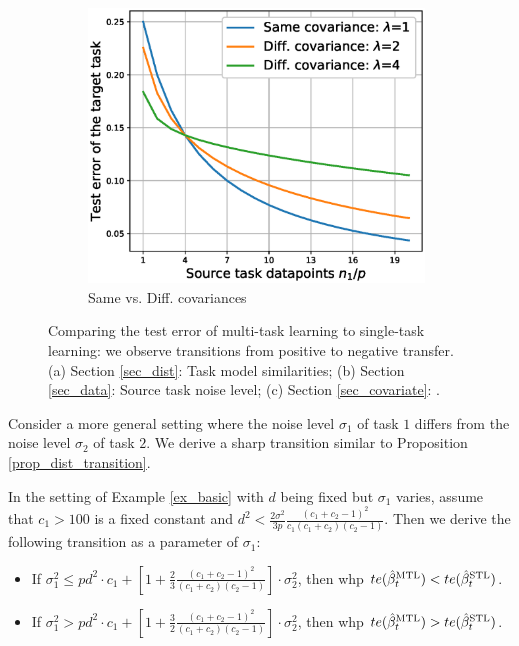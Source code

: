 \begin{figure}
\begin{subfigure}[b]{0.31\textwidth}
		\centering
		\includegraphics[width=0.98\textwidth]{figures/complementary.eps}
		\caption{Same vs. Diff. covariances}
	\end{subfigure}
	\caption{Comparing the test error of multi-task learning to single-task learning: we observe transitions from positive to negative transfer. (a) Section \ref{sec_dist}: Task model similarities; (b) Section \ref{sec_data}: Source task noise level; (c) Section \ref{sec_covariate}: .}
	\label{fig_model_shift_phasetrans}
\end{figure}


Consider a more general setting where the noise level $\sigma_1$ of task $1$ differs from the noise level $\sigma_2$ of task $2$.
We derive a sharp transition similar to Proposition \ref{prop_dist_transition}.

\begin{proposition}\label{prop_var_transition}
	In the setting of Example \ref{ex_basic} with $d$ being fixed but $\sigma_1$ varies, assume that $c_1 > 100$ is a fixed constant and $d^2 < \frac {2\sigma^2} {3p} \frac{(c_1 + c_2 -1)^2}{c_1 (c_1 + c_2)(c_2 - 1)}$. Then we derive the following transition as a parameter of $\sigma_1$:
	\begin{itemize}
		\item If $\sigma_1^2 \le p d^2 \cdot c_1 +\left[1+ \frac23\frac{(c_1 + c_2 - 1)^2}{(c_1 + c_2) (c_2 - 1)}\right]\cdot\sigma_2^2$, then whp $te(\hat{\beta}_t^{\text{MTL}}) < te(\hat{\beta}_t^{\text{STL}})$.
		\item If $\sigma_1^2 > p d^2 \cdot c_1 +\left[1+ \frac32\frac{(c_1 + c_2 - 1)^2}{(c_1 + c_2) (c_2 - 1)}\right] \cdot \sigma_2^2$, then whp $te(\hat{\beta}_t^{\text{MTL}}) > te(\hat{\beta}_t^{\text{STL}})$.
	\end{itemize}
\end{proposition}

